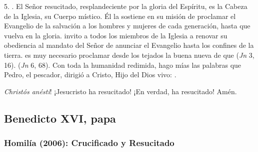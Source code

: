 \begin{body}
5. . El Señor resucitado, resplandeciente por la gloria del Espíritu, es la Cabeza de la Iglesia, su Cuerpo místico. Él la sostiene en su misión de proclamar el Evangelio de la salvación a los hombres y mujeres de cada generación, hasta que vuelva en la gloria.  invito a todos los miembros de la Iglesia a renovar su obediencia al mandato del Señor de anunciar el Evangelio hasta los confines de la tierra.  es muy necesario proclamar desde los tejados la buena nueva de que  (\textit{Jn} 3, 16).  (\textit{Jn} 6, 68).  Con toda la humanidad redimida, hago mías las palabras que Pedro, el pescador, dirigió a Cristo, Hijo del Dios vivo: .

\textit{Christós anésti}! ¡Jesucristo ha resucitado! ¡En verdad, ha resucitado! Amén.
\end{body}

\newsection
\subsection{Benedicto XVI, papa}

\subsubsection{Homilía (2006): Crucificado y Resucitado}


